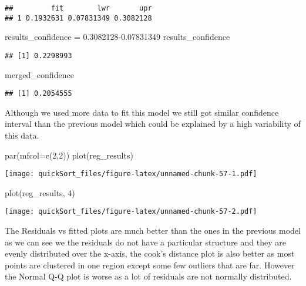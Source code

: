 \documentclass[
]{article}
\newenvironment{Shaded}{\begin{snugshade}}{\end{snugshade}}
\newcommand{\AttributeTok}[1]{\textcolor[rgb]{0.77,0.63,0.00}{#1}}
\newcommand{\DecValTok}[1]{\textcolor[rgb]{0.00,0.00,0.81}{#1}}
\newcommand{\FloatTok}[1]{\textcolor[rgb]{0.00,0.00,0.81}{#1}}
\newcommand{\FunctionTok}[1]{\textcolor[rgb]{0.00,0.00,0.00}{#1}}
\newcommand{\NormalTok}[1]{#1}
\newcommand{\OtherTok}[1]{\textcolor[rgb]{0.56,0.35,0.01}{#1}}
\begin{document}
\begin{verbatim}
##         fit        lwr       upr
## 1 0.1932631 0.07831349 0.3082128
\end{verbatim}

\begin{Shaded}
\begin{Highlighting}[]
\NormalTok{results\_confidence }\OtherTok{=} \FloatTok{0.3082128{-}0.07831349}
\NormalTok{results\_confidence}
\end{Highlighting}
\end{Shaded}

\begin{verbatim}
## [1] 0.2298993
\end{verbatim}

\begin{Shaded}
\begin{Highlighting}[]
\NormalTok{merged\_confidence}
\end{Highlighting}
\end{Shaded}

\begin{verbatim}
## [1] 0.2054555
\end{verbatim}

Although we used more data to fit this model we still got similar
confidence interval than the previous model which could be explained by
a high variability of this data.

\begin{Shaded}
\begin{Highlighting}[]
\FunctionTok{par}\NormalTok{(}\AttributeTok{mfcol=}\FunctionTok{c}\NormalTok{(}\DecValTok{2}\NormalTok{,}\DecValTok{2}\NormalTok{))}
\FunctionTok{plot}\NormalTok{(reg\_results)}
\end{Highlighting}
\end{Shaded}

\texttt{[image: quickSort\_files/figure-latex/unnamed-chunk-57-1.pdf]}

\begin{Shaded}
\begin{Highlighting}[]
\FunctionTok{plot}\NormalTok{(reg\_results, }\DecValTok{4}\NormalTok{)}
\end{Highlighting}
\end{Shaded}

\texttt{[image: quickSort\_files/figure-latex/unnamed-chunk-57-2.pdf]}

The Residuals vs fitted plots are much better than the ones in the
previous model as we can see we the residuals do not have a particular
structure and they are evenly distributed over the x-axis, the cook's
distance plot is also better as most points are clustered in one region
except some few outliers that are far. However the Normal Q-Q plot is
worse as a lot of residuals are not normally distributed.
\end{document}
